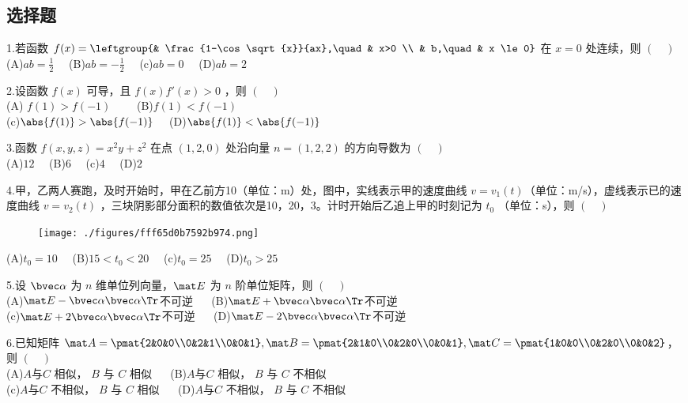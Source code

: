 
\subsection{选择题}
1.若函数 $f(x)=\leftgroup{& \frac{1-\cos \sqrt{x}}{ax},\quad  & x>0 \\ & b,\quad & x \le 0}$ 在 $x=0$ 处连续，则 $(\quad)$\\
(A)$ab=\frac{1}{2} \quad$
(B)$ab=-\frac{1}{2} \quad$
(c)$ab=0 \quad$
(D)$ab=2 \quad$

2.设函数 $f(x)$ 可导，且 $f(x)f'(x)>0$ ，则 $(\quad)$ \\
(A) $f(1)>f(-1) \qquad$
(B)$f(1)<f(-1) \quad$\\
(c)$\abs{f(1)}>\abs{f(-1)} \quad$
(D)$\abs{f(1)}<\abs{f(-1)} $

3.函数 $f(x,y,z)=x^2y+z^2$ 在点 $(1,2,0)$ 处沿向量 $n=(1,2,2)$ 的方向导数为 $(\quad)$\\
(A)$12 \quad$
(B)$6 \quad$
(c)$4 \quad$
(D)$2 \quad$


4.甲，乙两人赛跑，及时开始时，甲在乙前方10（单位：m）处，图中，实线表示甲的速度曲线 $v=v_1(t)$（单位：m/s），虚线表示已的速度曲线 $v=v_2(t)$ ，三块阴影部分面积的数值依次是10，20，3。计时开始后乙追上甲的时刻记为 $t_0$ （单位：s），则 $(\quad)$\\
\begin{figure}[ht]
\centering
\texttt{[image: ./figures/fff65d0b7592b974.png]}
\caption{} \label{fig_PeeM17_1}
\end{figure}
(A)$t_0=10 \quad$
(B)$15<t_0<20 \quad $
(c)$t_0=25\quad$
(D)$t_0>25$

5.设 $\bvec \alpha$ 为 $n$ 维单位列向量，$\mat E$ 为 $n$ 阶单位矩阵，则 $(\quad)$\\
(A)$\mat E- \bvec \alpha \bvec \alpha \Tr$不可逆 $\quad$
(B)$\mat E+ \bvec \alpha \bvec \alpha \Tr$不可逆\\
(c)$\mat E+ 2\bvec \alpha \bvec \alpha \Tr$不可逆 $\quad$
(D)$\mat E- 2\bvec \alpha \bvec \alpha \Tr$不可逆

6.已知矩阵 $\mat A=\pmat{2&0&0\\0&2&1\\0&0&1},\mat B=\pmat{2&1&0\\0&2&0\\0&0&1},\mat C=\pmat{1&0&0\\0&2&0\\0&0&2}$，则 $(\quad)$\\
(A)$A$与$C$ 相似， $B$ 与 $C$ 相似 $\quad$
(B)$A$与$C$ 相似， $B$ 与 $C$ 不相似 \\
(c)$A$与$C$ 不相似， $B$ 与 $C$ 相似 $\quad$
(D)$A$与$C$ 不相似， $B$ 与 $C$ 不相似 $\quad$

